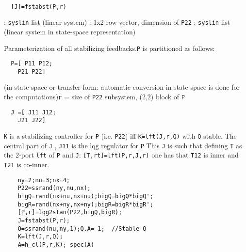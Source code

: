 \begin{mandesc}
   \\ %
\end{mandesc}
\begin{calling_sequence}
\begin{verbatim}
  [J]=fstabst(P,r)  
\end{verbatim}
\end{calling_sequence}
\begin{parameters}
  \begin{varlist}
    : \verb!syslin! list (linear system)
    : 1x2 row vector, dimension of \verb!P22!
    : \verb!syslin! list (linear system in state-space representation)
  \end{varlist}
\end{parameters}
\begin{mandescription}
  Parameterization of all stabilizing feedbacks.\verb!P! is partitioned as follows:
\begin{verbatim}
  P=[ P11 P12;
    P21 P22]  
\end{verbatim}
(in state-space or transfer form: automatic conversion in state-space is
done for the computations)\verb!r! = size of  \verb!P22! subsystem, (2,2) block of \verb!P!
\begin{verbatim}
  J =[ J11 J12;
    J21 J22]
\end{verbatim}
\verb!K! is a stabilizing controller for \verb!P! (i.e. \verb!P22!) iff 
\verb!K=lft(J,r,Q)! with \verb!Q! stable.
The central part of \verb!J! , \verb!J11! is the lqg regulator for \verb!P!
This \verb!J! is such that defining \verb!T! as the 2-port \verb!lft! of \verb!P!
and \verb!J!: \verb![T,rt]=lft(P,r,J,r)! one has that \verb!T12! is inner
and \verb!T21! is co-inner.
\end{mandescription}
\begin{examples}
  \begin{Verbatim}
    ny=2;nu=3;nx=4;
    P22=ssrand(ny,nu,nx);
    bigQ=rand(nx+nu,nx+nu);bigQ=bigQ*bigQ';
    bigR=rand(nx+ny,nx+ny);bigR=bigR*bigR';
    [P,r]=lqg2stan(P22,bigQ,bigR);
    J=fstabst(P,r);
    Q=ssrand(nu,ny,1);Q.A=-1;  //Stable Q
    K=lft(J,r,Q);
    A=h_cl(P,r,K); spec(A)
  \end{Verbatim}
\end{examples}
\begin{manseealso}
       
\end{manseealso}
